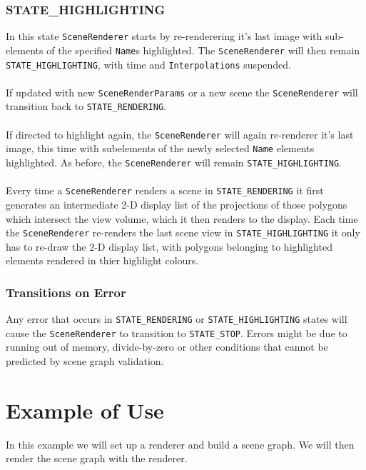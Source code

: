\documentclass[10pt,aps, prb,preprint]{article}
\begin{document}
\subsubsection{STATE\_HIGHLIGHTING}
In this state \texttt{SceneRenderer} starts by re-renderering it's last image with sub-elements of the specified \texttt{Name}s highlighted. The \texttt{SceneRenderer} will then remain \texttt{STATE\_HIGHLIGHTING}, with time and \texttt{Interpolations} suspended. 
\\
\\
If updated with new \texttt{SceneRenderParams} or a new scene the \texttt{SceneRenderer} will transition back to \texttt{STATE\_RENDERING}. 
\\
\\
If directed to highlight again, the \texttt{SceneRenderer} will again re-renderer it's last image, this time with subelements of the newly selected \texttt{Name} elements highlighted. As before, the \texttt{SceneRenderer} will remain \texttt{STATE\_HIGHLIGHTING}.
\\
\\
Every time a \texttt{SceneRenderer} renders a scene in \texttt{STATE\_RENDERING} it first generates an intermediate 2-D display list of the projections of those polygons which intersect the view volume, which it then renders to the display. Each time the \texttt{SceneRenderer} re-renders the last scene view in \texttt{STATE\_HIGHLIGHTING} it only has to re-draw the 2-D display list, with polygons belonging to highlighted elements rendered in thier highlight colours. 

\subsubsection{Transitions on Error}
Any error that occurs in \texttt{STATE\_RENDERING} or \texttt{STATE\_HIGHLIGHTING} states will cause the \texttt{SceneRenderer} to transition to \texttt{STATE\_STOP}. Errors might be due to running out of memory, divide-by-zero or other conditions that cannot be predicted by scene graph validation.


\newpage
\section{Example of Use}
In this example we will set up a renderer and build a scene graph. We will then render the scene graph with the renderer.
\end{document}
